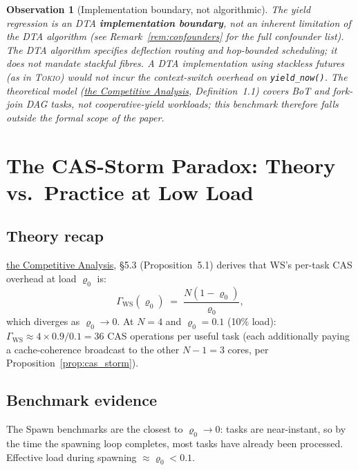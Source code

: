 \documentclass[11pt,a4paper]{article}
\newtheorem{observation}{Observation}[section]
\newcommand{\dtact}{\textsc{DTA}}
\newcommand{\tokio}{\textsc{Tokio}}
\begin{document}
\begin{observation}[Implementation boundary, not algorithmic]
The yield regression is an \dtact{} \textbf{implementation boundary},
not an inherent limitation of the DTA algorithm
(see Remark~\ref{rem:confounders} for the full confounder list).
The DTA algorithm specifies deflection routing and hop-bounded scheduling;
it does not mandate stackful fibres.
A DTA implementation using stackless futures (as in \tokio{}) would
not incur the context-switch overhead on \texttt{yield\_now()}.
The theoretical model (\hyperref[chap:competitive_ratio]{the Competitive Analysis},
Definition~1.1) covers BoT and fork-join DAG tasks, not cooperative-yield
workloads; this benchmark therefore falls outside the formal scope of the paper.
\end{observation}

\section{The CAS-Storm Paradox: Theory vs.\ Practice at Low Load}
\label{sec:cas_storm}

\subsection{Theory recap}

\hyperref[chap:competitive_ratio]{the Competitive Analysis}, \S5.3 (Proposition~5.1) derives that WS's
per-task CAS overhead at load $\varrho_0$ is:
\[
  \Gamma_{\mathrm{WS}}(\varrho_0) \;=\; \frac{N(1-\varrho_0)}{\varrho_0},
\]
which diverges as $\varrho_0 \to 0$.  At $N=4$ and $\varrho_0 = 0.1$
(10\% load): $\Gamma_{\mathrm{WS}} \approx 4 \times 0.9 / 0.1 = 36$
CAS operations per useful task (each additionally paying a cache-coherence
broadcast to the other $N-1=3$ cores, per Proposition~\ref{prop:cas_storm}).

\subsection{Benchmark evidence}

The Spawn benchmarks are the closest to $\varrho_0 \to 0$: tasks are
near-instant, so by the time the spawning loop completes, most tasks have
already been processed.  Effective load during spawning $\approx \varrho_0 < 0.1$.
\end{document}
